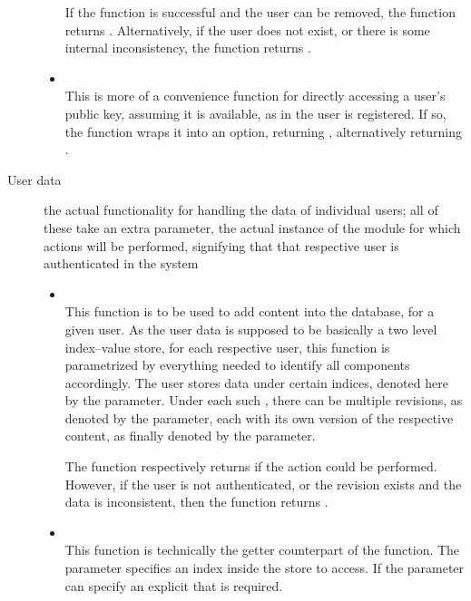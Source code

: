 \begin{description}
\begin{itemize}
  If the function is successful and the user can be removed, the function returns .
  Alternatively, if the user does not exist, or there is some internal inconsistency, the function returns .

  \item {} \\
  This is more of a convenience function for directly accessing a user's public key, assuming it is available, as in the user is registered.
  If so, the function wraps it into an option, returning , alternatively returning .
  \end{itemize}
  \item[User data] the actual functionality for handling the data of individual users; all of these take an extra parameter, the actual instance of the  module for which actions will be performed, signifying that that respective user is authenticated in the system
  \begin{itemize}
  \item {} \\
  This function is to be used to add content into the database, for a given user.
  As the user data is supposed to be basically a two level index--value store, for each respective user, this function is parametrized by everything needed to identify all components accordingly.
  The user stores data under certain indices, denoted here by the  parameter.
  Under each such , there can be multiple revisions, as denoted by the   parameter, each with its own version of the respective content, as finally denoted by the  parameter.

  The function respectively returns  if the action could be performed. However, if the user is not authenticated, or the revision exists and the data is inconsistent, then the function returns .

  \item {} \\
  This function is technically the getter counterpart of the  function.
  The  parameter specifies an index inside the store to access.
  If the  parameter can specify an explicit  that is required.


\end{itemize}
\end{description}
